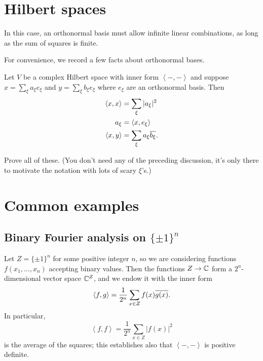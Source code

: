 \section{Hilbert spaces}
In this case, an orthonormal basis must allow
infinite linear combinations,
as long as the sum of squares is finite.

For convenience, we record a few facts about orthonormal bases.
\begin{proposition}
	\label{prop:orthonormal}
	Let $V$ be a complex Hilbert space
	with inner form $\left< -,-\right>$
	and suppose $x = \sum_\xi a_\xi e_\xi$ and $y = \sum_\xi b_\xi e_\xi$
	where $e_\xi$ are an orthonormal basis.
	Then
	\begin{align*}
		\left< x,x \right> &= \sum_\xi |a_\xi|^2 \\
		a_\xi &= \left< x, e_\xi \right> \\
		\left< x,y \right> &= \sum_\xi a_\xi \overline{b_\xi}.
	\end{align*}
\end{proposition}
\begin{ques}
	Prove all of these.
	(You don't need any of the preceding discussion,
	it's only there to motivate the notation with lots of scary $\xi$'s.)
\end{ques}

\section{Common examples}
\subsection{Binary Fourier analysis on $\{\pm1\}^n$}
Let $Z = \{\pm 1\}^n$ for some positive integer $n$,
so we are considering functions $f(x_1, \dots, x_n)$ accepting binary values.
Then the functions $Z \to \mathbb C$ form a $2^n$-dimensional vector space $\mathbb C^Z$,
and we endow it with the inner form
\[ \left< f,g \right> = \frac{1}{2^n} \sum_{x \in Z} f(x) \overline{g(x)}. \]
In particular,
\[ \left< f,f \right>
	= \frac{1}{2^n} \sum_{x \in Z} \left\lvert f(x) \right\rvert^2 \]
is the average of the squares;
this establishes also that $\left< -,-\right>$ is positive definite.

